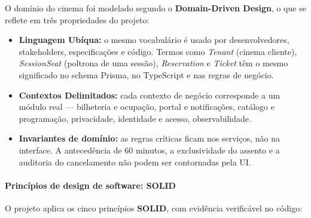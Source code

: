 O domínio do cinema foi modelado segundo o \textbf{Domain-Driven Design}, o que se reflete em três propriedades do projeto:

\begin{itemize}
\item \textbf{Linguagem Ubíqua:} o mesmo vocabulário é usado por desenvolvedores, stakeholders, especificações e código. Termos como \emph{Tenant} (cinema cliente), \emph{SessionSeat} (poltrona de uma sessão), \emph{Reservation} e \emph{Ticket} têm o mesmo significado no schema Prisma, no TypeScript e nas regras de negócio.
\item \textbf{Contextos Delimitados:} cada contexto de negócio corresponde a um módulo real — bilheteria e ocupação, portal e notificações, catálogo e programação, privacidade, identidade e acesso, observabilidade.
\item \textbf{Invariantes de domínio:} as regras críticas ficam nos serviços, não na interface. A antecedência de 60 minutos, a exclusividade do assento e a auditoria do cancelamento não podem ser contornadas pela UI.
\end{itemize}

\paragraph{Princípios de design de software: SOLID}

O projeto aplica os cinco princípios \textbf{SOLID}, com evidência verificável no código:


